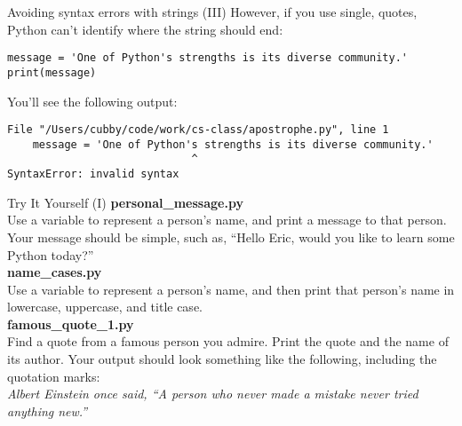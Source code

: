 \documentclass[aspectratio=169]{beamer}
\begin{document}
\begin{frame}[fragile]{Avoiding syntax errors with strings (III)}
    However, if you use single, quotes, Python can't identify where the string should end:
    \vspace{10pt}
    \begin{Verbatim}
message = 'One of Python's strengths is its diverse community.'
print(message)
    \end{Verbatim}
    \vspace{15pt}
    You'll see the following output:
    \vspace{10pt}
    \begin{Verbatim}[fontsize=\footnotesize]
  File "/Users/cubby/code/work/cs-class/apostrophe.py", line 1
    message = 'One of Python's strengths is its diverse community.'
                             ^
SyntaxError: invalid syntax
    \end{Verbatim}
\end{frame}


\begin{frame}{Try It Yourself (I)}
    \textbf{personal\_message.py} \\
    Use a variable to represent a person’s name, and print a message to that person.
    Your message should be simple, such as, ``Hello Eric, would you like to learn some Python today?'' \\
    \vspace{10pt}
    \textbf{name\_cases.py} \\
    Use a variable to represent a person’s name, and then print that person’s name in lowercase, uppercase, and title case. \\
    \vspace{10pt}
    \textbf{famous\_quote\_1.py} \\
    Find a quote from a famous person you admire.
    Print the quote and the name of its author.
    Your output should look something like the following, including the quotation marks: \\
    \textit{Albert Einstein once said, ``A person who never made a mistake never tried anything new.''} \\
\end{frame}
\end{document}

